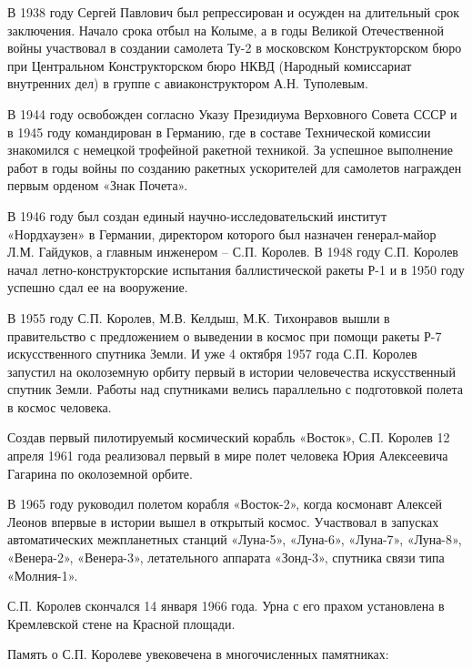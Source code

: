 
В 1938 году Сергей Павлович был репрессирован и осужден на длительный срок
заключения. Начало срока отбыл на Колыме, а в годы Великой Отечественной войны
участвовал в создании самолета Ту-2 в московском Конструкторском бюро при
Центральном Конструкторском бюро НКВД (Народный комиссариат внутренних дел) в
группе с авиаконструктором А.Н. Туполевым.

В 1944 году освобожден согласно Указу Президиума Верховного Совета СССР и в
1945 году командирован в Германию, где в составе Технической комиссии
знакомился с немецкой трофейной ракетной техникой. За успешное выполнение работ
в годы войны по созданию ракетных ускорителей для самолетов награжден первым
орденом «Знак Почета».

В 1946 году был создан единый научно-исследовательский институт «Нордхаузен» в
Германии, директором которого был назначен генерал-майор Л.М. Гайдуков, а
главным инженером – С.П. Королев. В 1948 году С.П. Королев начал
летно-конструкторские испытания баллистической ракеты Р-1 и в 1950 году успешно
сдал ее на вооружение.

В 1955 году С.П. Королев, М.В. Келдыш, М.К. Тихонравов вышли в правительство с
предложением о выведении в космос при помощи ракеты Р-7 искусственного спутника
Земли. И уже 4 октября 1957 года С.П. Королев запустил на околоземную орбиту
первый в истории человечества искусственный спутник Земли. Работы над
спутниками велись параллельно с подготовкой полета в космос человека.

Создав первый пилотируемый космический корабль «Восток», С.П. Королев 12 апреля
1961 года реализовал первый в мире полет человека Юрия Алексеевича Гагарина по
околоземной орбите.

В 1965 году руководил полетом корабля «Восток-2», когда космонавт Алексей
Леонов впервые в истории вышел в открытый космос. Участвовал в запусках
автоматических межпланетных станций «Луна-5», «Луна-6»,  «Луна-7», «Луна-8»,
«Венера-2», «Венера-3», летательного аппарата  «Зонд-3», спутника связи типа
«Молния-1».

С.П. Королев скончался 14 января 1966 года. Урна с его прахом установлена в
Кремлевской стене на Красной площади.

Память о С.П. Королеве увековечена в многочисленных памятниках:

